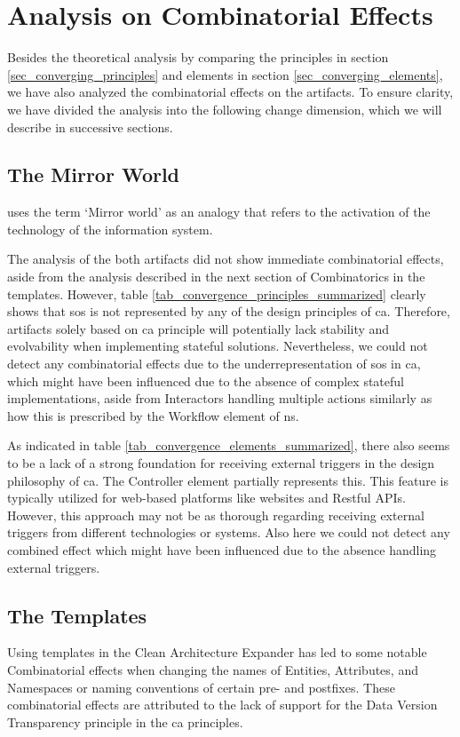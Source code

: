 \section{Analysis on Combinatorial Effects}

Besides the theoretical analysis by comparing the principles in section
\ref{sec_converging_principles} and elements in section \ref{sec_converging_elements}, we
have also analyzed the combinatorial effects on the artifacts. To ensure clarity, we have
divided the analysis into the following change dimension, which we will describe in
successive sections.

\subsection{The Mirror World}
\textcite[137]{mannaert_normalized_2016} uses the term \enquote*{Mirror world} as an
analogy that refers to the activation of the technology of the information system. 

The analysis of the both artifacts did not show immediate combinatorial effects, aside
from the analysis described in the next section of Combinatorics in the templates.
However, table \ref{tab_convergence_principles_summarized} clearly shows that \gls{sos} is
not represented by any of the design principles of \gls{ca}. Therefore, artifacts solely
based on \gls{ca} principle will potentially lack stability and evolvability when
implementing stateful solutions. Nevertheless, we could not detect any combinatorial
effects due to the underrepresentation of \acrlong{sos} in \gls{ca}, which might have been
influenced due to the absence of complex stateful implementations, aside from Interactors
handling multiple actions similarly as how this is prescribed by the Workflow element of
\gls{ns}.

As indicated in table \ref{tab_convergence_elements_summarized}, there also seems to be a
lack of a strong foundation for receiving external triggers in the design philosophy of
\gls{ca}. The Controller element partially represents this. This feature is typically
utilized for web-based platforms like websites and Restful APIs. However, this approach
may not be as thorough regarding receiving external triggers from different technologies
or systems. Also here we could not detect any combined effect which might have been
influenced due to the absence handling external triggers.

\subsection{The Templates}
Using templates in the Clean Architecture Expander has led to some notable Combinatorial
effects when changing the names of Entities, Attributes, and Namespaces or naming
conventions of certain pre- and postfixes. These combinatorial effects are attributed to
the lack of support for the Data Version Transparency principle in the \gls{ca}
principles.

